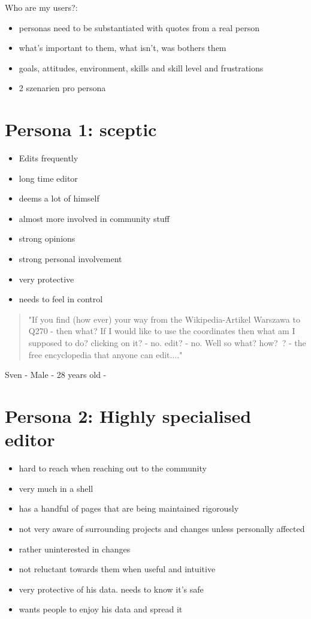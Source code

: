 \documentclass{article}
\date{11.11.2015}
\begin{document}
Who are my users?:
\begin{itemize}
\item personas need to be substantiated with quotes from a real person
\item what's important to them, what isn't, was bothers them
\item goals, attitudes, environment, skills and skill level and frustrations
\item 2 szenarien pro persona
\end{itemize}

\section{Persona 1: sceptic}

\begin{itemize}
\item Edits frequently
\item long time editor
\item deems a lot of himself 
\item almost more involved in community stuff
\item strong opinions
\item strong personal involvement
\item very protective
\item needs to feel in control 
\end{itemize}

\begin{quote}
"If you find (how ever) your way from the Wikipedia-Artikel Warszawa to Q270 - then what? If I would like to use the coordinates then what am I supposed to do? clicking on it? - no. edit? - no. Well so what? how? ? - the free encyclopedia that anyone can edit...."
\end{quote}

\noindent
Sven - Male - 28 years old -  \\


\section{Persona 2: Highly specialised editor}

\begin{itemize}
\item hard to reach when reaching out to the community
\item very much in a shell
\item has a handful of pages that are being maintained rigorously
\item not very aware of surrounding projects and changes unless personally affected
\item rather uninterested in changes
\item not reluctant towards them when useful and intuitive
\item very protective of his data. needs to know it's safe
\item wants people to enjoy his data and spread it
\end{itemize}
\end{document}
